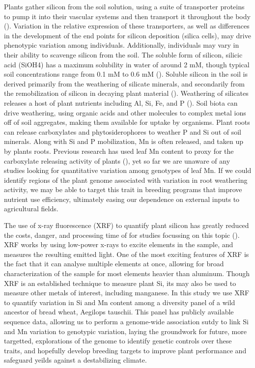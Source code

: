 \documentclass[12pt, letterpaper, ]{report}
\begin{document}
Plants gather silicon from the soil solution, using a suite of transporter proteins to pump it into their vascular systems and then transport it throughout the body (\cite{reynolds_silicon_2016}).  Variation in the relative expression of these transporters, as well as differences in the development of the end points for silicon deposition (silica cells), may drive phenotypic variation among individuals. Additionally, individuals may vary in their ability to scavenge silicon from the soil. The soluble form of silicon, silicic acid (SiOH4) has a maximum solubility in water of around 2 mM, though typical soil concentrations range from 0.1 mM to 0.6 mM (\cite{epstein_anomaly_1994}). Soluble silicon in the soil is derived primarily from the weathering of silicate minerals, and secondarily from the remobilization of silicon in decaying plant material (\cite{de_tombeur_silicon_2021-1}). Weathering of silicates releases a host of plant nutrients including Al, Si, Fe, and P (\cite{de_tombeur_silicon_2021-1}). Soil biota can drive weathering, using organic acids and other molecules to complex metal ions off of soil aggregates, making them available for uptake by organisms. Plant roots can release carboxylates and phytosiderophores to weather P and Si out of soil minerals. Along with Si and P mobilization, Mn is often released, and taken up by plants roots. Previous research has used leaf Mn content to proxy for the carboxylate releasing activity of plants (\cite{lambers_leaf_2015}), yet so far we are unaware of any studies looking for quantitative variation among genotypes of leaf Mn. If we could identify regions of the plant genome associated with variation in root weathering activity, we may be able to target this trait in breeding programs that improve nutrient use efficiency, ultimately easing our dependence on external inputs to agricultural fields. 

The use of x-ray fluorescence (XRF) to quantify plant silicon has greatly reduced the costs, danger, and processing time of for studies focussing on this topic (\cite{reidinger_rapid_2012}). XRF works by using low-power x-rays to excite elements in the sample, and measures the resulting emitted light. One of the most exciting features of XRF is the fact that it can analyse multiple elements at once, allowing for broad characterization of the sample for most elements heavier than aluminum. Though XRF is an established technique to measure plant Si, its may also be used to measure other metals of interest, including manganese. In this study we use XRF to quantify variation in Si and Mn content among a diversity panel of a wild ancestor of bread wheat, Aegilops tauschii. This panel has publicly available sequence data, allowing us to perform a genome-wide association sutdy to link Si and Mn variation to genotypic variation, laying the groundwork for future, more targetted, explorations of the genome to identify genetic controls over these traits, and hopefully develop breeding targets to improve plant performance and safeguard yeilds against a destabilizing climate.
\end{document}
